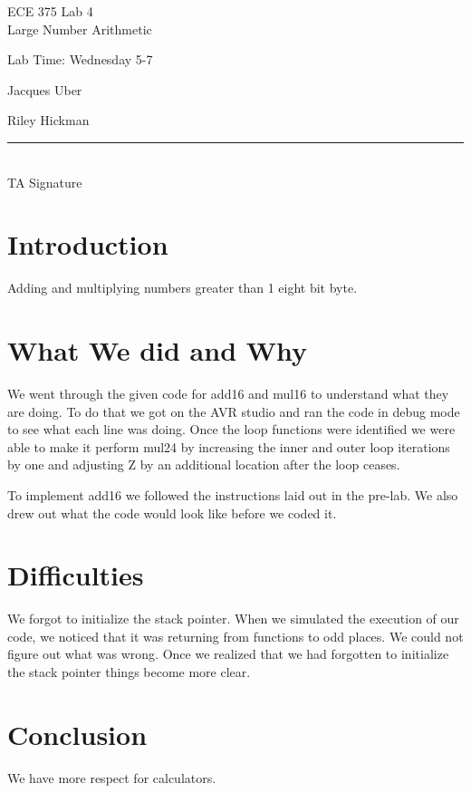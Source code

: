 \documentclass[12pt,letterpaper]{article}
\begin{document}
\begin{titlepage}
    \vspace*{4cm}
    \begin{flushright}
    {\huge
        ECE 375 Lab 4\\[1cm]
    }
    {\large
        Large Number Arithmetic
    }
    \end{flushright}
    \begin{flushleft}
    Lab Time: Wednesday 5-7
    \end{flushleft}
    \begin{flushright}
    Jacques Uber

    Riley Hickman

    \vfill
    \rule{5in}{.5mm}\\
    TA Signature
    \end{flushright}

\end{titlepage}
\section{Introduction}
Adding and multiplying numbers greater than 1 eight bit byte.

\section{What We did and Why}
We went through the given code for add16 and mul16 to understand what they are doing.  To do that we got on the AVR studio and ran the code in debug mode to see what each line was doing.  Once the loop functions were identified we were able to make it perform mul24 by increasing the inner and outer loop iterations by one and adjusting Z by an additional location after the loop ceases.

To implement add16 we followed the instructions laid out in the pre-lab. We also drew out what the code would look like before we coded it.

\section{Difficulties}
We forgot to initialize the stack pointer. When we simulated the execution of our code, we noticed that it was returning from functions to odd places. We could not figure out what was wrong. Once we realized that we had forgotten to initialize the stack pointer things become more clear.

\section{Conclusion}
We have more respect for calculators.
\end{document}
